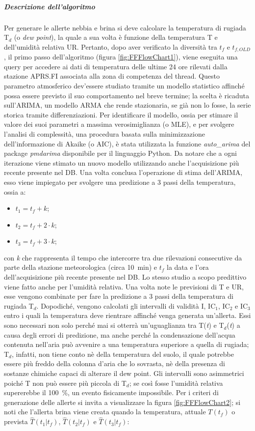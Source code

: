 \subparagraph{Descrizione dell'algoritmo} Per generare le allerte nebbia e brina si deve calcolare la temperatura di rugiada T$_d$ (o \textit{dew point}), la quale a sua volta è funzione della temperatura T e dell'umidità relativa UR. Pertanto, dopo aver verificato la diversità tra $t_f$ e $t_{f,OLD}$, il primo passo dell'algoritmo (figura \ref{fig:FFFlowChart1}), viene eseguita una query per accedere ai dati di temperatura delle ultime 24 ore rilevati dalla stazione APRS.FI associata alla zona di competenza del thread. Questo parametro atmosferico dev'essere studiato tramite un modello statistico affinché possa essere previsto il suo comportamento nel breve termine; la scelta è ricaduta sull'ARIMA, un modello ARMA che rende stazionaria, se già non lo fosse, la serie storica tramite differenziazioni. Per identificare il modello, ossia per stimare il valore dei suoi parametri a massima verosimiglianza (o MLE), e per svolgere l'analisi di complessità, una procedura basata sulla minimizzazione dell'informazione di Akaike (o AIC), è stata utilizzata la funzione \textit{auto\_arima} del package \textit{pmdarima} disponibile per il linguaggio Python. Da notare che a ogni iterazione viene stimato un nuovo modello utilizzando anche l'acquisizione più recente presente nel DB. Una volta conclusa l'operazione di stima dell'ARIMA, esso viene impiegato per svolgere una predizione a 3 passi della temperatura, ossia a:
\begin{itemize}
	\item $t_1 = t_f + k$; 
	\item $t_2 = t_f + 2 \cdot k$;
	\item $t_3 = t_f + 3 \cdot k$; 
\end{itemize}
con \textit{k} che rappresenta il tempo che intercorre tra due rilevazioni consecutive da parte della stazione meteorologica (circa \SI{10}{\minute}) e $t_f$ la data e l'ora dell'acquisizione più recente presente nel DB. Lo stesso studio a scopo predittivo viene fatto anche per l'umidità relativa. Una volta note le previsioni di T e UR, esse vengono combinate per fare la predizione a 3 passi della temperatura di rugiada T$_d$. Dopodiché, vengono calcolati gli intervalli di validità I, IC$_1$, IC$_2$ e IC$_3$ entro i quali la temperatura deve rientrare affinché venga generata un'allerta. Essi sono necessari non solo perché mai si otterrà un'uguaglianza tra T(\textit{t}) e T$_d$(\textit{t}) a causa degli errori di predizione, ma anche perché la condensazione dell'acqua contenuta nell'aria può avvenire a una temperatura superiore a quella di rugiada; T$_d$, infatti, non tiene conto nè della temperatura del suolo, il quale potrebbe essere più freddo della colonna d'aria che lo sovrasta, nè della presenza di sostanze chimiche capaci di alterare il dew point. Gli intervalli sono asimmetrici poiché T non può essere più piccola di T$_d$; se così fosse l'umidità relativa supererebbe il \SI{100}{\percent}, un evento fisicamente impossibile. Per i criteri di generazione delle allerte si invita a visualizzare la figura \ref{fig:FFFlowChart2}; si noti che l'allerta brina viene creata quando la temperatura, attuale $T(t_f)$ o prevista $\hat{T}(t_1|t_f)$, $\hat{T}(t_2|t_f)$ e $\hat{T}(t_3|t_f)$: 
